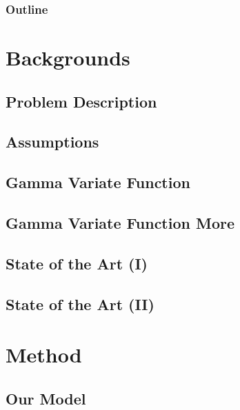 \documentclass[aspectratio=169]{beamer}
\begin{document}
\frame{\titlepage}                     %

\begin{frame}
  \frametitle{Outline}
  \tableofcontents
\end{frame}





\section{Backgrounds}
\subsection{Problem Description}

\subsection{Assumptions}

\subsection{Gamma Variate Function}

\subsection{Gamma Variate Function More}

\subsection{State of the Art (I)}

\subsection{State of the Art (II)}





\section{Method}
\subsection{Our Model}

\end{document}
